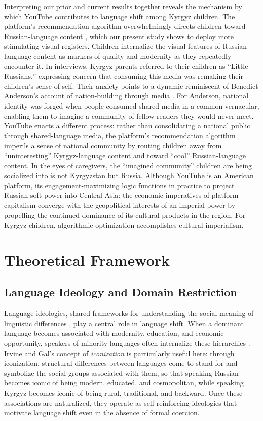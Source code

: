 \documentclass[12pt, letterpaper]{article}
\begin{document}
Interpreting our prior and current results together reveals the mechanism by which YouTube contributes to language shift among Kyrgyz children. The platform's recommendation algorithm overwhelmingly directs children toward Russian-language content \citep{escher2026empire, mcdermott2026}, which our present study shows to deploy more stimulating visual registers. Children internalize the visual features of Russian-language content as markers of quality and modernity as they repeatedly encounter it. In interviews, Kyrgyz parents referred to their children as ``Little Russians,'' expressing concern that consuming this media was remaking their children's sense of self. Their anxiety points to a dynamic reminiscent of Benedict Anderson's account of nation-building through media \citep{anderson1983}. For Anderson, national identity was forged when people consumed shared media in a common vernacular, enabling them to imagine a community of fellow readers they would never meet. YouTube enacts a different process: rather than consolidating a national public through shared-language media, the platform's recommendation algorithm imperils a sense of national community by routing children away from ``uninteresting'' Kyrgyz-language content and toward ``cool'' Russian-language content. In the eyes of caregivers, the ``imagined community'' children are being socialized into is not Kyrgyzstan but Russia. Although YouTube is an American platform, its engagement-maximizing logic functions in practice to project Russian soft power into Central Asia: the economic imperatives of platform capitalism converge with the geopolitical interests of an imperial power by propelling the continued dominance of its cultural products in the region. For Kyrgyz children, algorithmic optimization accomplishes cultural imperialism.

\section{Theoretical Framework}

\subsection{Language Ideology and Domain Restriction}

Language ideologies, shared frameworks for understanding the social meaning of linguistic
differences \citep{woolard1998}, play a central role in language shift. When a dominant
language becomes associated with modernity, education, and economic opportunity, speakers
of minority languages often internalize these hierarchies \citep{irvine2000}.
Irvine and Gal's concept of \textit{iconization} is particularly useful here: through
iconization, structural differences between languages come to stand for and symbolize the
social groups associated with them, so that speaking Russian becomes iconic of being modern,
educated, and cosmopolitan, while speaking Kyrgyz becomes iconic of being rural, traditional,
and backward. Once these associations are naturalized, they operate as self-reinforcing
ideologies that motivate language shift even in the absence of formal coercion.
\end{document}
